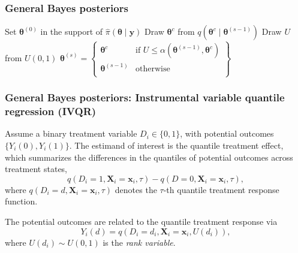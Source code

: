 \documentclass[12pt, compress]{beamer}
\begin{document}
\begin{frame}
	\frametitle{General Bayes posteriors}
\begin{algorithm}[H]
	\caption{General Bayes posterior: Metropolis-Hastings algorithm}\label{Alg:GibbsPosteior}
	\begin{algorithmic}[1]
		\State Set $\bm{\theta}^{(0)}$ in the support of $\hat{\pi}(\bm{\theta}\mid \bm{y})$  		 			
		\State Draw $\bm{\theta}^{c}$ from $q(\bm{\theta}^{c}\mid \bm{\theta}^{(s-1)})$
		\State Draw $U$ from $U(0,1)$
		\State $\bm{\theta}^{(s)}=\begin{Bmatrix}
			\bm{\theta}^{c} & \text{if } U\leq \alpha(\bm{\theta}^{(s-1)}, \bm{\theta}^{c})\\
			\bm{\theta}^{(s-1)} & \text{otherwise}\\
		\end{Bmatrix}$
		\EndFor 
	\end{algorithmic} 
\end{algorithm}
\end{frame}

\begin{frame}
	\frametitle{General Bayes posteriors: Instrumental variable quantile regression (IVQR)}
Assume a binary treatment variable $D_i\in\{0,1\}$, with potential outcomes $\{Y_i(0),Y_i(1)\}$. The estimand of interest is the quantile treatment effect, which summarizes the differences in the quantiles of potential outcomes across treatment states,
\[
q(D_i=1,\mathbf{X}_i=\mathbf{x}_i,\tau)-q(D=0,\mathbf{X}_i=\mathbf{x}_i,\tau),
\] 
where $q(D_i=d,\mathbf{X}_i=\mathbf{x}_i,\tau)$ denotes the $\tau$-th quantile treatment response function.  

The potential outcomes are related to the quantile treatment response via
\[
Y_i(d)=q(D_i=d_i,\mathbf{X}_i=\mathbf{x}_i,U(d_i)),
\]
where $U(d_i)\sim U(0,1)$ is the \textit{rank variable}.
\end{frame}
\end{document}
